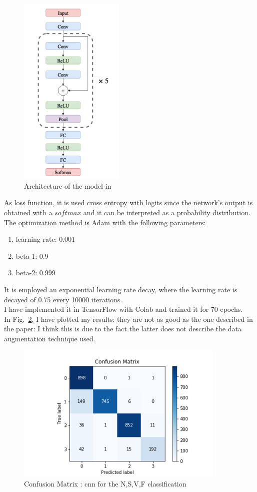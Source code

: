 \documentclass[LaM,binding=0.6cm]{sapthesis}
\begin{document}
\begin{figure}[H]  \centering
	\includegraphics[width=50mm,scale=0.7]{arch-cnn}
	\caption{Architecture of the model in \cite{cnnfazeli}}
	\label{fig:arch-cnn}
\end{figure}
As loss function, it is used cross entropy with logits since the network's output is obtained with a $softmax$ and it can be interpreted as a probability distribution.\\The optimization method is Adam with the following parameters:
\begin{enumerate}
\item learning rate: 0.001
\item beta-1: 0.9
\item beta-2: 0.999
\end{enumerate}
It is employed an exponential learning rate decay, where the learning rate is decayed of 0.75 every 10000 iterations.\\I have implemented it in TensorFlow with Colab and trained it for 70 epochs.\\In Fig.~\ref{fig:cnn1}, I have plotted my results: they are not as good as the one described in the paper: I think this is due to the fact the latter does not describe the data augmentation technique used.
\begin{figure}[H]  \centering
	\includegraphics[width=100mm,scale=0.7]{cnn-no-data-aug.png}
	\caption{Confusion Matrix : cnn for the N,S,V,F classification}
	\label{fig:cnn1}
\end{figure}
\end{document}
